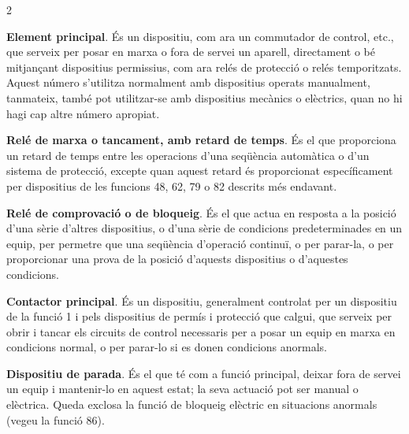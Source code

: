 \begin{multicols}{2}
	\begin{list}{}
		{\setlength{\labelwidth}{6mm} \setlength{\leftmargin}{6mm}
			\setlength{\labelsep}{2mm}}
		
		\item[\textbf{1}]  
		\textbf{Element principal}. És un dispositiu, com ara un commutador de control, etc., que serveix per posar en marxa o fora de servei un aparell, directament o bé  mitjançant
		dispositius permissius, com ara relés de protecció o relés temporitzats. Aquest número s'utilitza normalment amb dispositius operats manualment, tanmateix, també pot utilitzar-se amb dispositius mecànics o elèctrics, quan no hi hagi cap altre número apropiat.
		
		\item[\textbf{2}]    
		  
		\textbf{Relé de marxa o tancament, amb retard de temps}. És el que
		proporciona un retard de temps entre les operacions d'una seqüència
		automàtica o d'un sistema de protecció, excepte quan aquest retard
		és proporcionat específicament per dispositius de les funcions 48, 62, 79 o 82
		descrits més endavant.
		
		\item[\textbf{3}]  
		\textbf{Relé de comprovació o de bloqueig}. És el que actua en resposta a la posició d'una sèrie
		d'altres dispositius, o d'una sèrie de condicions predeterminades
		en un equip, per  permetre que una seqüència d'operació
		continuï, o per  parar-la, o per proporcionar una prova de la
		posició d'aquests dispositius o d'aquestes condicions.
		
		\item[\textbf{4}]  
		\textbf{Contactor principal}. És un dispositiu,
		generalment controlat per un dispositiu de la funció 1 i pels dispositius de permís i protecció
		que calgui, que serveix per obrir i tancar els circuits de control necessaris per a posar un equip en marxa en condicions normal, o per parar-lo  si es donen condicions anormals.
		
		\item[\textbf{5}]    
		\textbf{Dispositiu de parada}. És el que
		té com a funció principal, deixar fora de servei un equip i
		mantenir-lo en aquest estat; la seva actuació pot ser manual o
		elèctrica. Queda exclosa la funció de bloqueig elèctric en
		situacions anormals (vegeu la funció 86).
		

\end{list}
\end{multicols}
